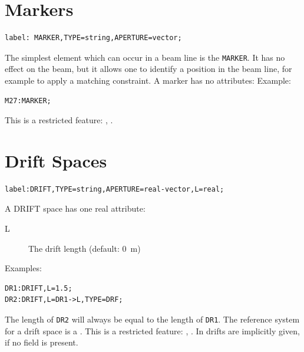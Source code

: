 \section{Markers}
\label{sec:marker}
\begin{verbatim}
label: MARKER,TYPE=string,APERTURE=vector;
\end{verbatim}
The simplest element which can occur in a beam line is the \texttt{MARKER}.
It has no effect on the beam,
but it allows one to identify a position in the beam line,
for example to apply a matching constraint.
A marker has no attributes:
\noindent Example:
\begin{verbatim}
M27:MARKER;
\end{verbatim}
This is a restricted feature: \noopalt, \noopalcycl .

\section{Drift Spaces}
\label{sec:drift}
\begin{verbatim}
label:DRIFT,TYPE=string,APERTURE=real-vector,L=real;
\end{verbatim}
A DRIFT space has one real attribute:
\begin{description}
\item[L]
  The drift length (default: 0~m)
\end{description}
\noindent Examples:
\begin{verbatim}
DR1:DRIFT,L=1.5;
DR2:DRIFT,L=DR1->L,TYPE=DRF;
\end{verbatim}
The length of \texttt{DR2} will always be equal to the length of \texttt{DR1}.
The reference system for a drift space is a 
.
This is a restricted feature: \noopalt, \noopalcycl . In \opalt drifts are implicitly given, if no field is present.
